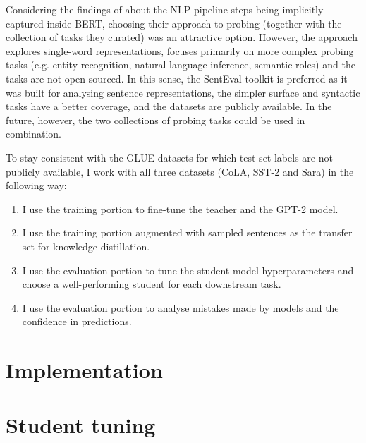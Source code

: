 \documentclass[bsc,frontabs,twoside,singlespacing,parskip,deptreport]{infthesis}
\begin{document}
{{    Considering the findings of \citet{Tenney_2019b} about the NLP pipeline steps being implicitly captured inside BERT, choosing their approach to probing (together with the collection of tasks they curated) was an attractive option. However, the approach explores single-word representations, focuses primarily on more complex probing tasks (e.g. entity recognition, natural language inference, semantic roles) and the tasks are not open-sourced. In this sense, the SentEval toolkit is preferred as it was built for analysing sentence representations, the simpler surface and syntactic tasks have a better coverage, and the datasets are publicly available. In the future, however, the two collections of probing tasks could be used in combination.
  }

  To stay consistent with the GLUE datasets for which test-set labels are not publicly available, I work with all three datasets (CoLA, SST-2 and Sara) in the following way:
  \begin{enumerate}
    \item I use the training portion to fine-tune the teacher and the GPT-2 model.
    \item I use the training portion augmented with sampled sentences as the transfer set for knowledge distillation.
    \item I use the evaluation portion to tune the student model hyperparameters and choose a well-performing student for each downstream task.
    \item I use the evaluation portion to analyse mistakes made by models and the confidence in predictions.
  \end{enumerate}
}

\chapter{Implementation}{
  \label{chap:implementation}
}

\chapter{Student tuning}{
}
\end{document}
